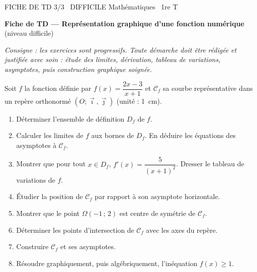 \documentclass[11pt]{article}
\begin{document}
\begin{tcolorbox}[enhanced,colback=popink,colframe=popink,arc=10pt,boxrule=0pt,left=12pt,right=12pt,top=9pt,bottom=9pt]
{\color{white}\popxbold\small FICHE DE TD 3/3 \textbullet\ DIFFICILE \hfill Mathématiques \textbullet\ 1re T\par}
\end{tcolorbox}
\vspace{4pt}
\textbf{Fiche de TD — Représentation graphique d'une fonction numérique} (niveau difficile)

\medskip
\emph{Consigne : les exercices sont progressifs. Toute démarche doit être rédigée et justifiée avec soin : étude des limites, dérivation, tableau de variations, asymptotes, puis construction graphique soignée.}

\begin{exercice}
Soit $f$ la fonction définie par $f(x)=\dfrac{2x-3}{x+1}$ et $\mathscr{C}_f$ sa courbe représentative dans un repère orthonormé $(O;\vec{\imath},\vec{\jmath})$ (unité : \SI{1}{\centi\metre}).
\begin{enumerate}
\item Déterminer l'ensemble de définition $D_f$ de $f$.
\item Calculer les limites de $f$ aux bornes de $D_f$. En déduire les équations des asymptotes à $\mathscr{C}_f$.
\item Montrer que pour tout $x\in D_f$, $f'(x)=\dfrac{5}{(x+1)^2}$. Dresser le tableau de variations de $f$.
\item Étudier la position de $\mathscr{C}_f$ par rapport à son asymptote horizontale.
\item Montrer que le point $\Omega(-1\,;\,2)$ est centre de symétrie de $\mathscr{C}_f$.
\item Déterminer les points d'intersection de $\mathscr{C}_f$ avec les axes du repère.
\item Construire $\mathscr{C}_f$ et ses asymptotes.
\item Résoudre graphiquement, puis algébriquement, l'inéquation $f(x)\geq 1$.
\end{enumerate}
\end{exercice}
\end{document}
